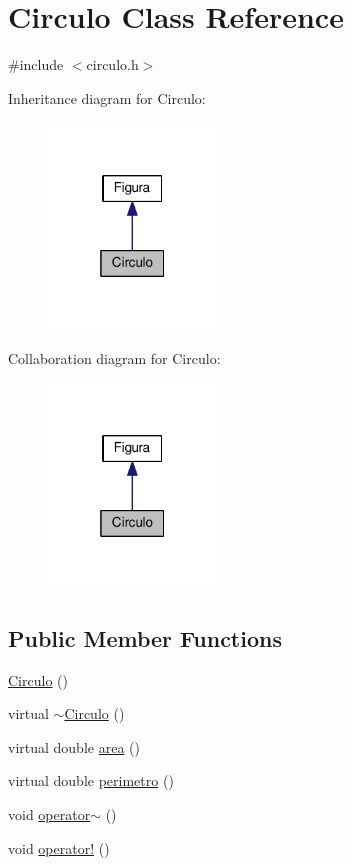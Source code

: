 \hypertarget{classCirculo}{}\section{Circulo Class Reference}
\label{classCirculo}


{\ttfamily \#include $<$circulo.\+h$>$}



Inheritance diagram for Circulo\+:
\nopagebreak
\begin{figure}[H]
\begin{center}
\leavevmode
\includegraphics[width=127pt]{classCirculo__inherit__graph}
\end{center}
\end{figure}


Collaboration diagram for Circulo\+:
\nopagebreak
\begin{figure}[H]
\begin{center}
\leavevmode
\includegraphics[width=127pt]{classCirculo__coll__graph}
\end{center}
\end{figure}
\subsection*{Public Member Functions}
\begin{DoxyCompactItemize}
\item 
\hyperlink{classCirculo_a6933bf908b78a4167684081a3a8f257f}{Circulo} ()
\item 
virtual \hyperlink{classCirculo_a8efe39e0e89487519cd802f0738d3bf4}{$\sim$\+Circulo} ()
\item 
virtual double \hyperlink{classCirculo_aded0c4ee374eb000f59d8d8da01ad72d}{area} ()
\item 
virtual double \hyperlink{classCirculo_acc35f8fdd7303fca9fe54b0da458bdf2}{perimetro} ()
\item 
void \hyperlink{classCirculo_a8db226b0c3bad5b8a01d60afb45838c7}{operator$\sim$} ()
\item 
void \hyperlink{classCirculo_a64bd2cabfdbca872d44bf1eb13f59cbb}{operator!} ()
\end{DoxyCompactItemize}
